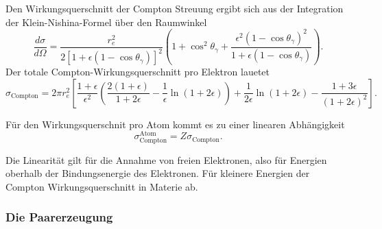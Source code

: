 Den Wirkungsquerschnitt der Compton Streuung ergibt sich aus der Integration der Klein-Nishina-Formel über den Raumwinkel
\begin{equation}
    \frac{d \sigma}{d \Omega}=\frac{r_e^2}{2\left[1+\epsilon\left(1-\cos \theta_\gamma\right)\right]^2}\left(1+\cos ^2 \theta_\gamma+\frac{\epsilon^2\left(1-\cos \theta_\gamma\right)^2}{1+\epsilon\left(1-\cos \theta_\gamma\right)}\right).
\end{equation}
Der totale Compton-Wirkungsquerschnitt pro Elektron lauetet
\begin{equation}
    \sigma_{\text{Compton}}=2 \pi r_e^2\left[\frac{1+\epsilon}{\epsilon^2}\left(\frac{2(1+\epsilon)}{1+2 \epsilon}-\frac{1}{\epsilon} \ln (1+2 \epsilon)\right)+\frac{1}{2 \epsilon} \ln (1+2 \epsilon)-\frac{1+3 \epsilon}{(1+2 \epsilon)^2}\right].
    \label{eqn:Compton_Wirkungsquerschnitt}
\end{equation}

Für den Wirkungsquerschnit pro Atom kommt es zu einer linearen Abhängigkeit
\begin{equation}
    \sigma_{\text{Compton}}^{\text{Atom}}=Z \sigma_{\text{Compton}}.
\end{equation}

Die Linearität gilt für die Annahme von freien Elektronen, also für Energien oberhalb der
Bindungsenergie des Elektronen.
Für kleinere Energien der Compton Wirkungsquerschnitt in Materie ab.

\subsubsection{Die Paarerzeugung}
\label{paarerzeugung}